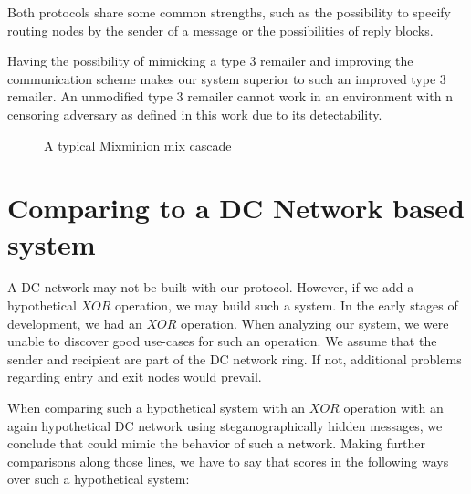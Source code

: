 Both protocols share some common strengths, such as the possibility to specify routing nodes by the sender of a message or the possibilities of reply blocks. 

Having the possibility of mimicking a type 3 remailer and improving the communication scheme makes our system superior to such an improved type 3 remailer. An unmodified type 3 remailer cannot work in an environment with n censoring adversary as defined in this work due to its detectability. 

\begin{figure}[ht]\centering
	
	\caption{A typical Mixminion mix cascade}
	\label{fig:mmCommPattern}
\end{figure}

\section{Comparing \MessageVortex{} to a DC Network based system}
A DC network may not be built with our \MessageVortex{} protocol. However, if we add a hypothetical $XOR$ operation, we may build such a system. In the early stages of development, we had an $XOR$ operation. When analyzing our system, we were unable to discover good use-cases for such an operation. We assume that the sender and recipient are part of the DC network ring. If not, additional problems regarding entry and exit nodes would prevail. 

When comparing such a hypothetical \MessageVortex{} system with an $XOR$ operation with an again hypothetical DC network using steganographically hidden messages, we conclude that \MessageVortex{} could mimic the behavior of such a network. Making further comparisons along those lines, we have to say that \MessageVortex{} scores in the following ways over such a hypothetical system:


